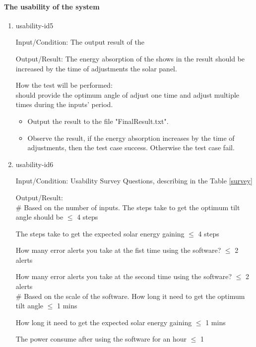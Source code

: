 \documentclass[12pt, titlepage]{article}
\begin{document}
\paragraph{The usability of the system}
\begin{enumerate}

\item{usability-id5\\}

Input/Condition: The output result of the \progname

Output/Result: The energy absorption of the shows in the result should be increased by the time of adjustments the solar panel.

How the test will be performed:\\
 \progname should provide the optimum angle of adjust one time and adjust multiple times during the inputs' period.

\begin{itemize} 
\item Output the result to the file "FinalResult.txt".
\item Observe the result, if the energy absorption increases by the time of adjustments, then the test case success. Otherwise the test case fail.
\end{itemize} 

\item{usability-id6\\}

Input/Condition: Usability Survey Questions, describing in the Table \ref{survey}

Output/Result: \\
$\#$ Based on the number of inputs.
The steps take to get the optimum tilt angle should be $\leq$ 4 steps

The steps take to get the expected solar energy gaining $\leq$ 4 steps

How many error alerts you take at the fist time using the software? $\leq$ 2 alerts

How many error alerts you take at the second time using the software? $\leq$ 2 alerts\\

$\#$ Based on the scale of the software.
How long it need to get the optimum tilt angle $\leq$ 1 mins

How long it need to get the expected solar energy gaining $\leq$ 1 mins

The power consume after using the software for an hour $\leq$ 1 %


\end{enumerate}
\end{document}

